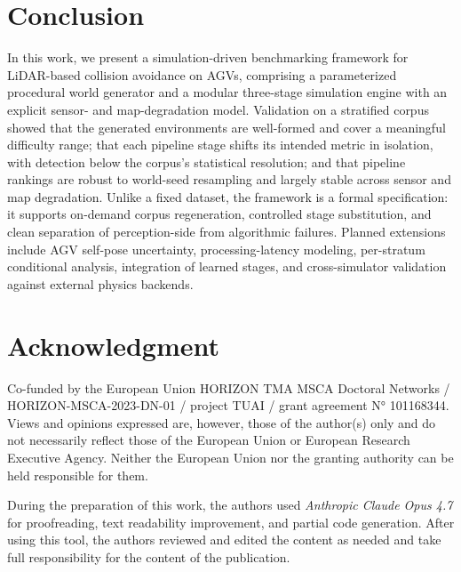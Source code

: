 \documentclass[conference]{IEEEtran}
\begin{document}
\section{Conclusion}
\label{sec:conclusion}
 

In this work, we present a simulation-driven benchmarking framework for LiDAR-based collision avoidance on AGVs, comprising a parameterized procedural world generator and a modular three-stage simulation engine with an explicit sensor- and map-degradation model. Validation on a stratified corpus showed that the generated environments are well-formed and cover a meaningful difficulty range; that each pipeline stage shifts its intended metric in isolation, with detection below the corpus's statistical resolution; and that pipeline rankings are robust to world-seed resampling and largely stable across sensor and map degradation. Unlike a fixed dataset, the framework is a formal specification: it supports on-demand corpus regeneration, controlled stage substitution, and clean separation of perception-side from algorithmic failures. Planned extensions include AGV self-pose uncertainty, processing-latency modeling, per-stratum conditional analysis, integration of learned stages, and cross-simulator validation against external physics backends.

\section*{Acknowledgment}
Co-funded by the European Union HORIZON TMA MSCA Doctoral Networks / HORIZON-MSCA-2023-DN-01 / project TUAI / grant agreement N° 101168344. Views and opinions expressed are, however, those of the author(s) only and do not necessarily reflect those of the European Union or European Research Executive Agency. Neither the European Union nor the granting authority can be held responsible for them.

During the preparation of this work, the authors used \textit{Anthropic Claude Opus 4.7} for proofreading, text readability improvement, and partial code generation. After using this tool, the authors reviewed and edited the content as needed and take full responsibility for the content of the publication.
 


 
\end{document}
